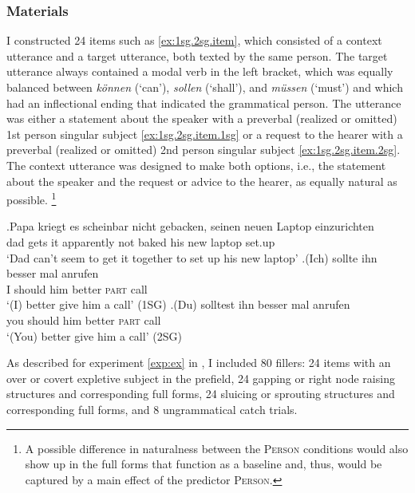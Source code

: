 \subsubsection{Materials}
I constructed 24 items such as \ref{ex:1sg.2sg.item}, which consisted of a context utterance and a target utterance, both texted by the same person.
The target utterance always contained a modal verb in the left bracket, which was equally balanced between \textit{können} (`can'), \textit{sollen} (`shall'), and \textit{müssen} (`must') and which had an inflectional ending that indicated the grammatical person.
The utterance was either a statement about the speaker with a preverbal (realized or omitted) 1st person singular subject \ref{ex:1sg.2sg.item.1sg} or a request to the hearer with a preverbal (realized or omitted) 2nd person singular subject \ref{ex:1sg.2sg.item.2sg}.
The context utterance was designed to make both options, i.e., the statement about the speaker and the request or advice to the hearer, as equally natural as possible.%
\footnote{A possible difference in naturalness between the \textsc{Person} conditions would also show up in the full forms that function as a baseline and, thus, would be captured by a main effect of the predictor \textsc{Person}.}
%

\exg.\label{ex:1sg.2sg.item}Papa kriegt es scheinbar nicht gebacken, seinen neuen Laptop einzurichten\\
dad gets it apparently not baked his new laptop set.up\\
`Dad can't seem to get it together to set up his new laptop\phantom{m}'
\ag.\label{ex:1sg.2sg.item.1sg}(Ich) sollte ihn besser mal anrufen\\
I should him better \textsc{part} call\\
`(I) better give him a call' \hfill (1SG)
\bg.\label{ex:1sg.2sg.item.2sg}(Du) solltest ihn besser mal anrufen\\
you should him better \textsc{part} call\\
`(You) better give him a call' \hfill (2SG)

As described for experiment \ref*{exp:ex} in , I included 80 fillers:
24 items with an over or covert expletive subject in the prefield, 24 gapping or right node raising structures and corresponding full forms, 24 sluicing or sprouting structures and corresponding full forms, and 8 ungrammatical catch trials.

